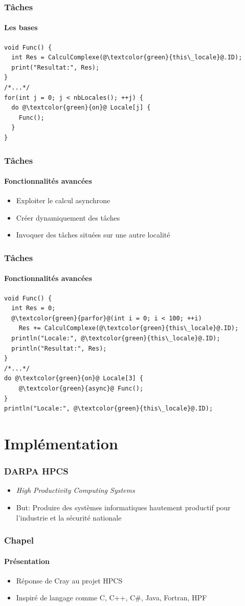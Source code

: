 \documentclass{beamer}
\begin{document}
\begin{frame}[fragile]
\frametitle{Tâches}
\framesubtitle{Les bases}
\begin{lstlisting}
void Func() {
  int Res = CalculComplexe(@\textcolor{green}{this\_locale}@.ID);
  print("Resultat:", Res);
}
/*...*/
for(int j = 0; j < nbLocales(); ++j) {
  do @\textcolor{green}{on}@ Locale[j] {
    Func();
  }
}
\end{lstlisting}
\end{frame}

\begin{frame}
\frametitle{Tâches}
\framesubtitle{Fonctionnalités avancées}
\begin{itemize}
\item Exploiter le calcul asynchrone
\item Créer dynamiquement des tâches
\item Invoquer des tâches situées sur une autre localité
\end{itemize}
\end{frame}

\begin{frame}[fragile]
\frametitle{Tâches}
\framesubtitle{Fonctionnalités avancées}
\begin{lstlisting}
void Func() {
  int Res = 0;
  @\textcolor{green}{parfor}@(int i = 0; i < 100; ++i)
    Res += CalculComplexe(@\textcolor{green}{this\_locale}@.ID);
  println("Locale:", @\textcolor{green}{this\_locale}@.ID);
  println("Resultat:", Res);
}
/*...*/
do @\textcolor{green}{on}@ Locale[3] {
    @\textcolor{green}{async}@ Func();
}
println("Locale:", @\textcolor{green}{this\_locale}@.ID);
\end{lstlisting}
\end{frame}

\section{Implémentation}
\begin{frame}
\frametitle{DARPA HPCS}
\begin{itemize}
\item \textit{High Productivity Computing Systems}
\item But: Produire des systèmes informatiques hautement productif pour l'industrie et la sécurité nationale
\end{itemize}
\end{frame}

\begin{frame}
\frametitle{Chapel}
\framesubtitle{Présentation}
\begin{itemize}
\item Réponse de Cray au projet HPCS
\item Inspiré de langage comme C, C++, C\#, Java, Fortran, HPF
\end{itemize}
\end{frame}
\end{document}
